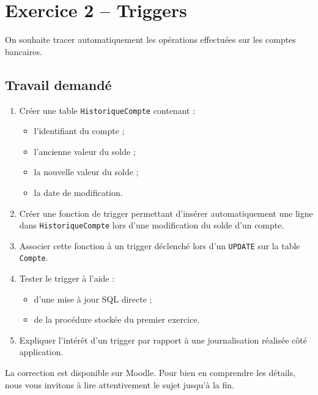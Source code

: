 \documentclass[11pt]{article}
\begin{document}
\section*{Exercice 2 -- Triggers}

On souhaite tracer automatiquement les opérations effectuées sur les comptes bancaires.

\subsection*{Travail demandé}

\begin{enumerate}[label=\alph*)]
    \item Créer une table \texttt{HistoriqueCompte} contenant :
    \begin{itemize}
        \item l’identifiant du compte ;
        \item l’ancienne valeur du solde ;
        \item la nouvelle valeur du solde ;
        \item la date de modification.
    \end{itemize}

    \item Créer une fonction de trigger permettant d’insérer automatiquement
    une ligne dans \texttt{HistoriqueCompte} lors d’une modification du solde d’un compte.

    \item Associer cette fonction à un trigger déclenché lors d’un \texttt{UPDATE}
    sur la table \texttt{Compte}.

    \item Tester le trigger à l’aide :
    \begin{itemize}
        \item d’une mise à jour SQL directe ;
        \item de la procédure stockée du premier exercice.
    \end{itemize}

    \item Expliquer l’intérêt d’un trigger par rapport à une journalisation
    réalisée côté application.
\end{enumerate}
La correction est disponible sur Moodle. Pour bien en comprendre les détails, nous vous invitons à lire attentivement le sujet jusqu’à la fin.
\bigskip

\end{document}
